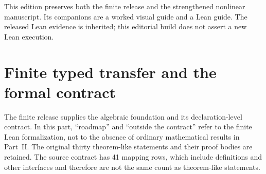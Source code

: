\documentclass[11pt,a4paper]{article}
\theoremstyle{plain}
\theoremstyle{definition}
\theoremstyle{remark}
\begin{document}
\KomorebiCover
{}


\begin{abstract}
Finite projector packets turn linear transfer into typed walks and arbitrary maps into exact coordinate representations. We separate canonical coordinate transport, which satisfies an exact cocycle law, from a chosen connection, whose failure to compose produces holonomy and packet obstruction witnesses. We then develop nonlinear packet jets and higher composition, convergent rooted tree expansions, graded operations, and nonlinear refinement defects. A specified correction map produces a canonical cokernel obstruction. Relative exact sequences, mapping cones, Hilbert splitting, nonlinear correction, and filtered lifting describe how these obstructions behave. Exact elimination produces Schur formulas, and finite transport reduces gluing to fundamental cycle holonomy. For smooth orthogonal packet families, direct packet rotations converge in operator norm to canonical unitary transport. The finite formal contract and the broader ordinary proof development are identified separately throughout.
\end{abstract}
\noindent This edition preserves both the finite release and the strengthened nonlinear manuscript. Its companions are a worked visual guide and a Lean guide. The released Lean evidence is inherited; this editorial build does not assert a new Lean execution.
\tableofcontents\listoffigures\clearpage
\part{Finite typed transfer and the formal contract}\label{part:finite}
\noindent The finite release supplies the algebraic foundation and its declaration-level contract. In this part, ``roadmap'' and ``outside the contract'' refer to the finite Lean formalization, not to the absence of ordinary mathematical results in Part~II. The original thirty theorem-like statements and their proof bodies are retained. The source contract has 41 mapping rows, which include definitions and other interfaces and therefore are not the same count as theorem-like statements.
\end{document}
